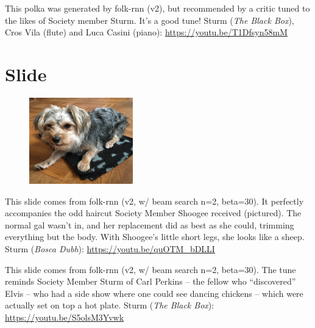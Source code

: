 \documentclass[a4paper,notitlepage,twoside]{book}
\begin{document}
\clearpage
{}
{}  
  
\hypertarget{polka:PolkaandRoll}{}
This polka was generated by folk-rnn (v2), but recommended by
a critic tuned to the likes of Society member Sturm.
It's a good tune!
Sturm ({\em The Black Box}), Cros Vila (flute) and Luca Casini (piano): \url{https://youtu.be/T1Dfsyn58mM}

\clearpage
\section{Slide}
{}  
\hypertarget{slide:SheepDog}{}
\begin{figure}
\vspace{-0.3in}
\includegraphics[width=0.4\textwidth]{sheepdog.JPG}
\end{figure}
This slide comes from folk-rnn (v2, w/ beam search n=2, beta=30). 
It perfectly accompanies the odd haircut Society Member Shoogee received (pictured). 
The normal gal wasn't in, and her replacement did as best as she could, trimming everything but the body. With Shoogee's little short legs, she looks like a sheep.
Sturm ({\em Bosca Dubh}): \url{https://youtu.be/quOTM_bDLLI}

\clearpage
{}
{}  
\hypertarget{slide:ChickensDancing}{}
This slide comes from folk-rnn (v2, w/ beam search n=2, beta=30). 
The tune reminds Society Member Sturm of Carl Perkins -- the fellow who
``discovered'' Elvis -- who had a side show where one could see
dancing chickens -- which were actually set on top a hot plate.
Sturm ({\em The Black Box}): \url{https://youtu.be/S5olsM3Yvwk}
\end{document}
